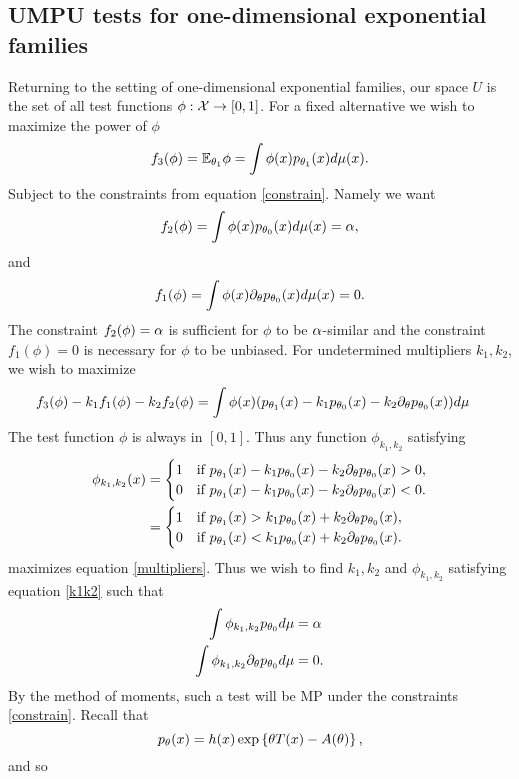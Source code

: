 \subsection{UMPU tests for one-dimensional exponential families}
Returning to the setting of one-dimensional exponential families, our space $U$ is the set of all test functions $\phi : {\mathcal{X}} \to [0,1]$. For a fixed alternative we wish to maximize the power of $\phi$
\[f_3(\phi)={\mathbb{E}}_{{\theta}_1}\phi = \int \phi(x)p_{{\theta}_1}(x)d\mu(x). \]
Subject to the constraints from equation \eqref{constrain}. Namely we want
\[f_2(\phi)=\int \phi(x)p_{{\theta}_0}(x)d\mu(x) = {\alpha}, \]
and
\[f_1(\phi) = \int \phi(x) \partial_{\theta} p_{{\theta}_0}(x)d\mu(x) = 0. \]
The constraint $f_2(\phi)={\alpha}$ is sufficient for $\phi$ to be ${\alpha}$-similar and the constraint $f_1(\phi)=0$ is necessary for $\phi$ to be unbiased. For undetermined multipliers $k_1,k_2$, we wish to maximize
\begin{align}\label{multipliers}
    f_3(\phi)-k_1f_1(\phi)-k_2f_2(\phi) &= \int \phi(x)(p_{{\theta}_1}(x)-k_1p_{{\theta}_0}(x)-k_2\partial_{\theta} p_{{\theta}_0}(x))d\mu 
\end{align}
The test function $\phi$ is always in $[0,1]$. Thus any function $\phi_{k_1,k_2}$ satisfying
\begin{align}\label{k1k2}
    \phi_{k_1,k_2}(x) &=\begin{cases}
        1 &\text{if }p_{{\theta}_1}(x)-k_1p_{{\theta}_0}(x)-k_2\partial_{\theta} p_{{\theta}_0}(x)>0,\\
        0 & \text{if }p_{{\theta}_1}(x)-k_1p_{{\theta}_0}(x)-k_2\partial_{\theta} p_{{\theta}_0}(x)<0.
    \end{cases}\nonumber\\
    &=\begin{cases}
        1 &\text{if }p_{{\theta}_1}(x)>k_1p_{{\theta}_0}(x)+k_2\partial_{\theta} p_{{\theta}_0}(x),\\
        0 & \text{if }p_{{\theta}_1}(x)<k_1p_{{\theta}_0}(x)+k_2\partial_{\theta} p_{{\theta}_0}(x).
    \end{cases}
\end{align}
maximizes equation \eqref{multipliers}. Thus we wish to find $k_1,k_2$ and $\phi_{k_1,k_2}$ satisfying equation \eqref{k1k2} such that 
\begin{align*}
    \int \phi_{k_1,k_2} p_{{\theta}_0}d\mu &={\alpha} \\
    \int \phi_{k_1,k_2} \partial_{\theta} p_{{\theta}_0} d\mu& =0.
\end{align*}
By the method of moments, such a test will be MP under the constraints \eqref{constrain}. Recall that 
\[p_{\theta}(x)=h(x)\exp\left\{{\theta} T(x)-A({\theta})\right\}, \]
and so 
